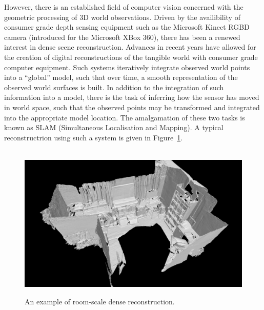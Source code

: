 However, there is an established field of computer vision concerned with the geometric processing 
of 3D world observations. Driven by the availibility of consumer grade depth sensing equipment such 
as the Microsoft Kinect RGBD camera (introduced for the Microsoft XBox 360), there has been a renewed 
interest in dense scene reconstruction. Advances in recent years have allowed for the creation of digital 
reconstructions of the tangible world with consumer grade computer equipment. Such systems iteratively 
integrate observed world points into a ``global'' model, such that over time, a smooth representation 
of the observed world surfaces is built. In addition to the integration of such information into a model, 
there is the task of inferring how the sensor has moved in world space, such that the observed points may 
be transformed and integrated into the appropriate model location. The amalgamation of these two tasks is 
known as SLAM (Simultaneous Localisation and Mapping). A typical reconstructrion using such a system is 
given in Figure~\ref{fig:room_recon_example}.
\begin{figure}[!htbp]
~\label{fig:room_recon_example}
  \centering
  \includegraphics[width=.9\linewidth]{figures/intro/room_scene.png}
  \caption[Room Scale Dense Reconstruction]{An example of room-scale dense reconstruction.}
\end{figure}

